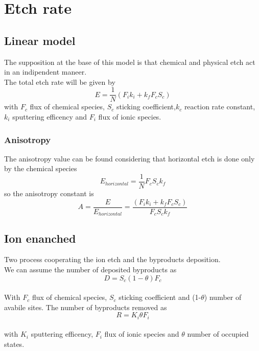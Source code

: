 
\section{Etch rate}

\subsection{Linear model}
The supposition at the base of this model is that chemical and physical etch act in an indipendent maneer.\\
The total etch rate will be given by
\begin{equation}
E=\frac{1}{N}\left( F_ik_i+k_fF_cS_c \right)
\end{equation}
with $F_c$ flux of chemical species, $S_c$ sticking coefficient,$k_c$ reaction rate constant, $k_i$ sputtering efficency and $F_i$ flux of ionic species.\\
\vspace{5mm}
\subsubsection{Anisotropy}
The anisotropy value can be found considering that horizontal etch is done only by the chemical species 
\begin{equation}
E_{horizontal}=\frac{1}{N}F_cS_ck_f
\end{equation}
so the anisotropy constant is 
\begin{equation}
A=\frac{E}{E_{horizontal}}=\frac{\left( F_ik_i+k_fF_cS_c \right)}{F_cS_ck_f}
\end{equation}


\subsection{Ion enanched}

Two process cooperating the ion etch and the byproducts deposition.\\
We can assume the number of deposited byproducts as
\begin{equation}
D=S_c(1-\theta)F_c
\end{equation}
\\
With $F_c$ flux of chemical species, $S_c$ sticking coefficient and (1-$\theta$) number of avabile sites.
The number of byproducts removed as
\begin{equation}
R=K_i\theta F_i
\end{equation}
\\
with $K_i$ sputtering efficency, $F_i$ flux of ionic species and $\theta$ number of occupied states.\\

